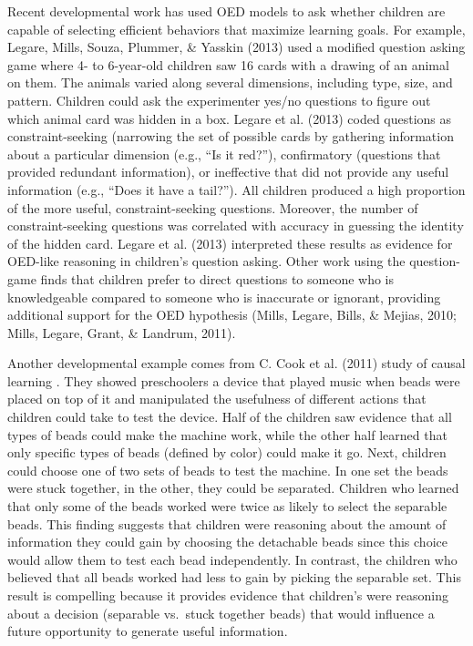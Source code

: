 \documentclass[oneside]{report}
\begin{document}
Recent developmental work has used OED models to ask whether children
are capable of selecting efficient behaviors that maximize learning
goals. For example, Legare, Mills, Souza, Plummer, \& Yasskin (2013)
used a modified question asking game where 4- to 6-year-old children saw
16 cards with a drawing of an animal on them. The animals varied along
several dimensions, including type, size, and pattern. Children could
ask the experimenter yes/no questions to figure out which animal card
was hidden in a box. Legare et al. (2013) coded questions as
constraint-seeking (narrowing the set of possible cards by gathering
information about a particular dimension (e.g., ``Is it red?''),
confirmatory (questions that provided redundant information), or
ineffective that did not provide any useful information (e.g., ``Does it
have a tail?''). All children produced a high proportion of the more
useful, constraint-seeking questions. Moreover, the number of
constraint-seeking questions was correlated with accuracy in guessing
the identity of the hidden card. Legare et al. (2013) interpreted these
results as evidence for OED-like reasoning in children's question
asking. Other work using the question-game finds that children prefer to
direct questions to someone who is knowledgeable compared to someone who
is inaccurate or ignorant, providing additional support for the OED
hypothesis (Mills, Legare, Bills, \& Mejias, 2010; Mills, Legare, Grant,
\& Landrum, 2011).

Another developmental example comes from C. Cook et al. (2011) study of
causal learning . They showed preschoolers a device that played music
when beads were placed on top of it and manipulated the usefulness of
different actions that children could take to test the device. Half of
the children saw evidence that all types of beads could make the machine
work, while the other half learned that only specific types of beads
(defined by color) could make it go. Next, children could choose one of
two sets of beads to test the machine. In one set the beads were stuck
together, in the other, they could be separated. Children who learned
that only some of the beads worked were twice as likely to select the
separable beads. This finding suggests that children were reasoning
about the amount of information they could gain by choosing the
detachable beads since this choice would allow them to test each bead
independently. In contrast, the children who believed that all beads
worked had less to gain by picking the separable set. This result is
compelling because it provides evidence that children's were reasoning
about a decision (separable vs.~stuck together beads) that would
influence a future opportunity to generate useful information.
\end{document}
